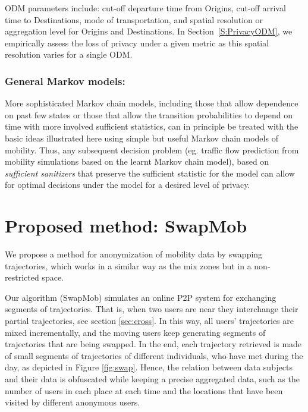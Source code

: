 \documentclass{llncs}
\begin{document}
ODM parameters include: cut-off departure time from Origins, cut-off arrival time to Destinations, mode of transportation, and spatial resolution or aggregation level for Origins and Destinations. 
In Section~\ref{S:PrivacyODM}, we empirically assess the loss of privacy under a given metric as this spatial resolution varies for a single ODM.  %


\subsubsection{General Markov models:}
More sophisticated Markov chain models, including those that allow dependence on past few states or those that allow the transition probabilities to depend on time with more involved sufficient statistics, can in principle be treated with the basic ideas illustrated here using simple but useful Markov chain models of mobility. 
Thus, any subsequent decision problem (eg. traffic flow prediction from mobility simulations based on the learnt Markov chain model), based on {\em sufficient sanitizers} that preserve the sufficient statistic for the model can allow for optimal decisions under the model for a desired level of privacy. 


\section{Proposed method: SwapMob}

We propose a method for anonymization of mobility data by swapping trajectories, which works in a similar way as the mix zones but in a non-restricted space.


Our algorithm (SwapMob) simulates an online P2P system for exchanging segments of trajectories. That is, when two users are near they interchange their partial trajectories, see section \ref{sec:cross}.
In this way, all users' trajectories are mixed incrementally, and the moving users keep generating segments of trajectories that are being swapped. In the end, each trajectory retrieved is made of small segments of trajectories of different individuals, who have met during the day, as depicted in Figure \ref{fig:swap}. Hence, the relation between data subjects and their data is obfuscated while keeping a precise aggregated data, such as the number of users in each place at each time and the locations that have been visited by different anonymous users.
\end{document}
